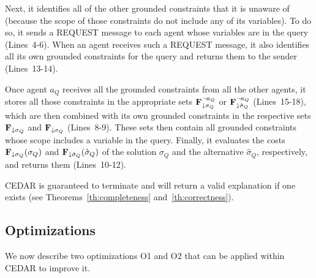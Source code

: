 \documentclass[twoside,11pt]{article}
\begin{document}
Next, it identifies all of the other grounded constraints that it is unaware of (because the scope of those constraints do not include any of its variables). To do so, it sends a REQUEST message to each agent whose variables are in the query (Lines~4-6). When an agent receives such a REQUEST message, it also identifies all its own grounded constraints for the query and returns them to the sender (Lines~13-14).

Once agent $a_Q$ receives all the grounded constraints from all the other agents, it stores all those constraints in the appropriate sets ${\bf{F}}^{\lnot a_Q}_{\downarrow \sigma_Q}$ or ${\bf{F}}^{\lnot a_Q}_{\downarrow \hat{\sigma}_Q}$ (Lines~15-18), which are then combined with its own grounded constraints in the respective sets ${\bf{F}}_{\downarrow \sigma_Q}$ and ${\bf{F}}_{\downarrow \sigma_Q}$ (Lines~8-9). These sets then contain all grounded constraints whose scope includes a variable in the query. Finally, it evaluates the costs ${\bf{F}}_{\downarrow \sigma_Q}(\sigma_Q)$ and ${\bf{F}}_{\downarrow \hat{\sigma}_Q}(\hat{\sigma}_Q)$ of the solution $\sigma_Q$ and the alternative $\hat{\sigma}_Q$, respectively, and returns them (Lines~10-12).

CEDAR is guaranteed to terminate and will return a valid explanation if one exists (see Theorems~\ref{th:completeness} and~\ref{th:correctness}).



\subsection{Optimizations}
\label{sec:XDCOP-opt}
We now describe two optimizations O1 and O2 that can be applied within CEDAR to improve it. 
\end{document}
